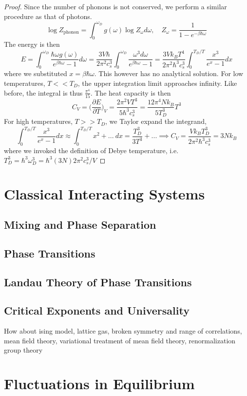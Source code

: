 \documentclass[a4paper]{article}
\theoremstyle{new}
\begin{document}
\begin{proof}
Since the number of phonons is not conserved, we perform a similar procedure as that of photons.
$$\log Z_{\text{phonon}}=\int_0^{\omega_D}g(\omega)\log Z_\omega d\omega,\quad Z_\omega=\frac{1}{1-e^{-\beta\hbar\omega}}$$
The energy is then
$$E=\int_0^{\omega_D}\frac{\hbar\omega g(\omega)}{e^{\beta\hbar\omega}-1}d\omega=\frac{3V\hbar}{2\pi^2c_s^3}\int_0^{\omega_D}\frac{\omega^3d\omega}{e^{\beta\hbar\omega}-1}=\frac{3Vk_BT^4}{2\pi^2\hbar^3c_s^3}\int_0^{T_D/T}\frac{x^3}{e^x-1}dx$$
where we substituted $x=\beta\hbar\omega$. This however has no analytical solution. For low temperatures, $T<<T_D$, the upper integration limit approaches infinity. Like before, the integral is thus $\frac{\pi^4}{15}$. The heat capacity is then
$$C_V=\bigg(\frac{\partial E}{\partial T}\bigg)_V=\frac{2\pi^2VT^3}{5\hbar^3c_s^3}=\frac{12\pi^4Nk_B}{5T_D^3}T^3$$
For high temperatures, $T>>T_D$, we Taylor expand the integrand,
$$\int_0^{T_D/T}\frac{x^3}{e^x-1}dx\approx\int_0^{T_D/T}x^2+...~dx=\frac{T_D^3}{3T^3}+...\implies C_V=\frac{Vk_BT_D^3}{2\pi^2\hbar^3c_s^3}=3Nk_B$$
where we invoked the definition of Debye temperature, i.e. $T_D^3=\hbar^3\omega_D^3=\hbar^3(3N)2\pi^2c_s^3/V$
\end{proof}
\newpage
\section{Classical Interacting Systems}
\subsection{Mixing and Phase Separation}
\subsection{Phase Transitions}
\subsection{Landau Theory of Phase Transitions}
\subsection{Critical Exponents and Universality}
How about ising model, lattice gas, broken symmetry and range of correlations, mean field theory, variational treatment of mean field theory, renormalization group theory


\newpage
\section{Fluctuations in Equilibrium}
\end{document}
